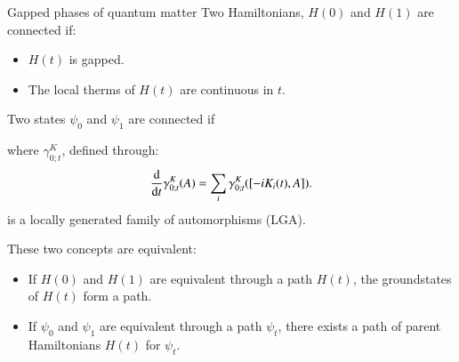 \documentclass{beamer}
\begin{document}
\begin{frame}{Gapped phases of quantum matter}
	Two Hamiltonians, $H(0)$ and $H(1)$ are connected if:
	\begin{center}
	\end{center}
	\begin{itemize}
		\item<2-> $H(t)$ is gapped.
		\item<3-> The local therms of $H(t)$ are continuous in $t$.
	\end{itemize}
	
\end{frame}

\begin{frame}
	Two states $\psi_0$ and $\psi_1$ are connected if
	\begin{center}
	\end{center}
	where $\gamma^K_{0;t}$, defined through:
	\[\frac{\textrm{d}}{\textrm{d} t}\gamma_{0;t}^K(A)=\sum_i \gamma_{0;t}^K([-iK_i(t),A]).\]
	is a locally generated family of automorphisms (LGA).
\end{frame}

\begin{frame}
	These two concepts are equivalent:
	\begin{itemize}
		\item<2-> If $H(0)$ and $H(1)$ are equivalent through a path $H(t)$, the groundstates of $H(t)$ form a path.
		\item<3-> If $\psi_0$ and $\psi_1$ are equivalent through a path $\psi_t$, there exists a path of parent Hamiltonians $H(t)$ for $\psi_t$.
	\end{itemize}
\end{frame}
\end{document}
